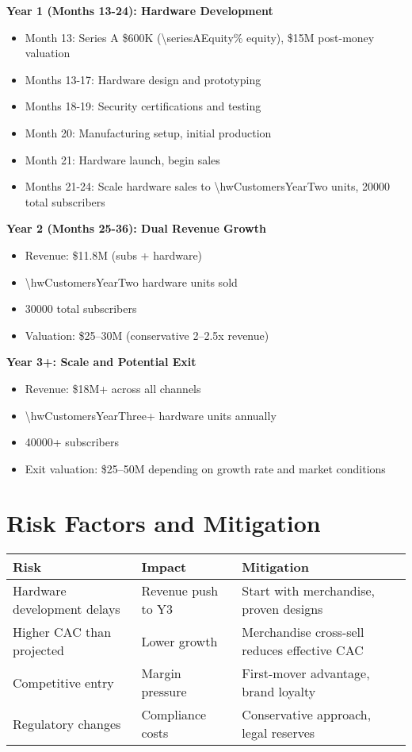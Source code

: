 \documentclass[11pt]{article}
\begin{document}
\textbf{Year 1 (Months 13-24): Hardware Development}
\begin{itemize}
  \item Month 13: Series A \$\num{600}K (\num{\seriesAEquity}\% equity), \$\num{15}M post-money valuation
  \item Months 13-17: Hardware design and prototyping
  \item Months 18-19: Security certifications and testing
  \item Month 20: Manufacturing setup, initial production
  \item Month 21: Hardware launch, begin sales
  \item Months 21-24: Scale hardware sales to \num{\hwCustomersYearTwo} units, \num{20000} total subscribers
\end{itemize}

\textbf{Year 2 (Months 25-36): Dual Revenue Growth}
\begin{itemize}
  \item Revenue: \$\num{11.8}M (subs + hardware)
  \item \num{\hwCustomersYearTwo} hardware units sold
  \item \num{30000} total subscribers
  \item Valuation: \$\num{25}--\num{30}M (conservative \num{2}--\num{2.5}x revenue)
\end{itemize}

\textbf{Year 3+: Scale and Potential Exit}
\begin{itemize}
  \item Revenue: \$\num{18}M+ across all channels
  \item \num{\hwCustomersYearThree}+ hardware units annually
  \item \num{40000}+ subscribers
  \item Exit valuation: \$\num{25}--\num{50}M depending on growth rate and market conditions
\end{itemize}

\section{Risk Factors and Mitigation}

\begin{table}[H]
\centering
\begin{tabularx}{\linewidth}{l X X}
\toprule
Risk & Impact & Mitigation \\\midrule
Hardware development delays & Revenue push to Y3 & Start with merchandise, proven designs \\
Higher CAC than projected & Lower growth & Merchandise cross-sell reduces effective CAC \\
Competitive entry & Margin pressure & First-mover advantage, brand loyalty \\
Regulatory changes & Compliance costs & Conservative approach, legal reserves \\
\bottomrule
\end{tabularx}
\end{table}

\printbibliography
\end{document}
